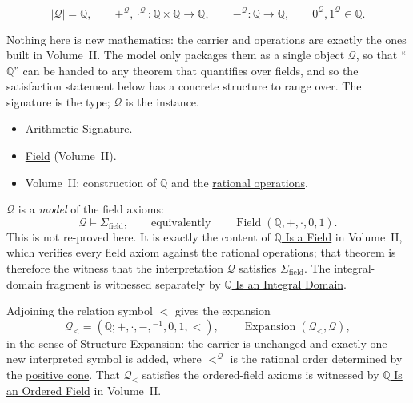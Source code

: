 \begin{remark*}
\[
|\mathcal{Q}|=\mathbb{Q},\qquad
+^{\mathcal{Q}},\cdot^{\mathcal{Q}}:\mathbb{Q}\times\mathbb{Q}\to\mathbb{Q},\qquad
-^{\mathcal{Q}}:\mathbb{Q}\to\mathbb{Q},\qquad
0^{\mathcal{Q}},1^{\mathcal{Q}}\in\mathbb{Q}.
\]
\end{remark*}

\begin{remark*}[Interpretation]
Nothing here is new mathematics: the carrier and operations are exactly the ones
built in Volume~II. The model only packages them as a single object
$\mathcal{Q}$, so that ``$\mathbb{Q}$'' can be handed to any theorem that
quantifies over fields, and so the satisfaction statement below has a concrete
structure to range over. The signature is the type; $\mathcal{Q}$ is the
instance.
\end{remark*}

\begin{remark*}[Dependencies]
\begin{itemize}
  \item \hyperref[def:arithmetic-signature]{Arithmetic Signature}.
  \item \hyperref[def:field]{Field} (Volume~II).
  \item Volume~II: construction of $\mathbb{Q}$ and the
        \hyperref[def:rational-operations]{rational operations}.
\end{itemize}
\end{remark*}

\begin{remark*}[Satisfaction]
$\mathcal{Q}$ is a \emph{model} of the field axioms:
\[
\mathcal{Q}\models \Sigma_{\mathrm{field}},
\qquad\text{equivalently}\qquad
\operatorname{Field}(\mathbb{Q},+,\cdot,0,1).
\]
This is not re-proved here. It is exactly the content of
\hyperref[thm:q-is-field]{$\mathbb{Q}$ Is a Field} in Volume~II, which verifies
every field axiom against the rational operations; that theorem is therefore the
witness that the interpretation $\mathcal{Q}$ satisfies
$\Sigma_{\mathrm{field}}$. The integral-domain fragment is witnessed separately
by \hyperref[thm:q-is-integral-domain]{$\mathbb{Q}$ Is an Integral Domain}.
\end{remark*}

\begin{remark*}
Adjoining the relation symbol $<$ gives the expansion
\[
\mathcal{Q}_{<}=(\mathbb{Q};+,\cdot,-,{}^{-1},0,1,<),
\qquad
\operatorname{Expansion}(\mathcal{Q}_{<},\mathcal{Q}),
\]
in the sense of \hyperref[def:structure-expansion]{Structure Expansion}: the
carrier is unchanged and exactly one new interpreted symbol is added, where
$<^{\mathcal{Q}}$ is the rational order determined by the
\hyperref[def:positive-cone]{positive cone}. That $\mathcal{Q}_{<}$ satisfies the
ordered-field axioms is witnessed by
\hyperref[thm:q-is-ordered-field]{$\mathbb{Q}$ Is an Ordered Field} in
Volume~II.
\end{remark*}

